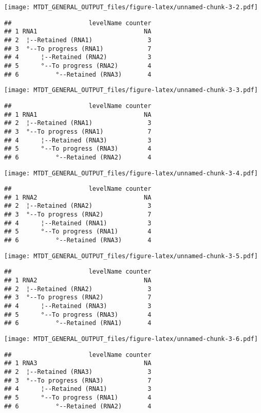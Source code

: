 \documentclass[
]{article}
\begin{document}
\texttt{[image: MTDT\_GENERAL\_OUTPUT\_files/figure-latex/unnamed-chunk-3-2.pdf]}

\begin{verbatim}
##                     levelName counter
## 1 RNA1                             NA
## 2  ¦--Retained (RNA1)               3
## 3  °--To progress (RNA1)            7
## 4      ¦--Retained (RNA2)           3
## 5      °--To progress (RNA2)        4
## 6          °--Retained (RNA3)       4
\end{verbatim}

\texttt{[image: MTDT\_GENERAL\_OUTPUT\_files/figure-latex/unnamed-chunk-3-3.pdf]}

\begin{verbatim}
##                     levelName counter
## 1 RNA1                             NA
## 2  ¦--Retained (RNA1)               3
## 3  °--To progress (RNA1)            7
## 4      ¦--Retained (RNA3)           3
## 5      °--To progress (RNA3)        4
## 6          °--Retained (RNA2)       4
\end{verbatim}

\texttt{[image: MTDT\_GENERAL\_OUTPUT\_files/figure-latex/unnamed-chunk-3-4.pdf]}

\begin{verbatim}
##                     levelName counter
## 1 RNA2                             NA
## 2  ¦--Retained (RNA2)               3
## 3  °--To progress (RNA2)            7
## 4      ¦--Retained (RNA1)           3
## 5      °--To progress (RNA1)        4
## 6          °--Retained (RNA3)       4
\end{verbatim}

\texttt{[image: MTDT\_GENERAL\_OUTPUT\_files/figure-latex/unnamed-chunk-3-5.pdf]}

\begin{verbatim}
##                     levelName counter
## 1 RNA2                             NA
## 2  ¦--Retained (RNA2)               3
## 3  °--To progress (RNA2)            7
## 4      ¦--Retained (RNA3)           3
## 5      °--To progress (RNA3)        4
## 6          °--Retained (RNA1)       4
\end{verbatim}

\texttt{[image: MTDT\_GENERAL\_OUTPUT\_files/figure-latex/unnamed-chunk-3-6.pdf]}

\begin{verbatim}
##                     levelName counter
## 1 RNA3                             NA
## 2  ¦--Retained (RNA3)               3
## 3  °--To progress (RNA3)            7
## 4      ¦--Retained (RNA1)           3
## 5      °--To progress (RNA1)        4
## 6          °--Retained (RNA2)       4
\end{verbatim}
\end{document}

